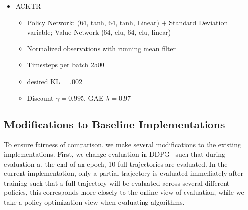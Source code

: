 \begin{itemize}
\begin{itemize}
        \item Conjugate gradient iterations = 20
        \item CG damping = 0.1
        \item VF Iterations = 5
        \item VF Batch Size = 64
        \item VF Step Size = $1e-3$
        \item entropy coeff = 0.0
        \item Discount $\gamma=0.995$, GAE $\lambda=0.97$
    \end{itemize}
    \item ACKTR
    \begin{itemize}
        \item Policy Network: (64, tanh, 64, tanh, Linear) + Standard Deviation variable; Value Network (64, elu, 64, elu, linear)
        \item Normalized observations with running mean filter
        \item Timesteps per batch 2500
        \item desired KL = .002
        \item Discount $\gamma=0.995$, GAE $\lambda=0.97$
    \end{itemize}
\end{itemize}


\subsection{Modifications to Baseline Implementations}
To ensure fairness of comparison, we make several modifications to the existing implementations. First, we change evaluation in DDPG~\cite{plappert2017parameter} such that during evaluation at the end of an epoch, 10 full trajectories are evaluated. In the current implementation, only a partial trajectory is evaluated immediately after training such that a full trajectory will be evaluated across several different policies, this corresponds more closely to the online view of evaluation, while we take a policy optimization view when evaluating algorithms.

